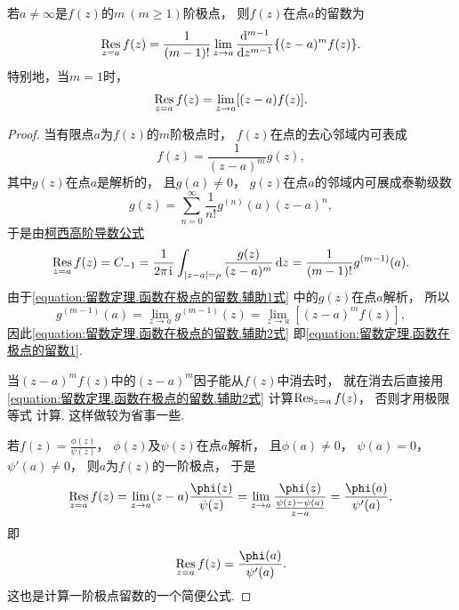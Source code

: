 \begin{property}
若\(a\neq\infty\)是\(f(z)\)的\(m\ (m\geq1)\)阶极点，
则\(f(z)\)在点\(a\)的留数为
\begin{equation}\label{equation:留数定理.函数在极点的留数1}
	\operatorname*{Res}_{z=a} f(z)
	= \frac{1}{(m-1)!} \lim_{z \to a} \dv[m-1]{z} \{ (z-a)^m f(z) \}.
\end{equation}
特别地，当\(m=1\)时，
\begin{equation}\label{equation:留数定理.函数在极点的留数2}
	\operatorname*{Res}_{z=a} f(z)
	= \lim_{z \to a} [(z-a) f(z)].
\end{equation}
\begin{proof}
当有限点\(a\)为\(f(z)\)的\(m\)阶极点时，
\(f(z)\)在点的去心邻域内可表成
\begin{equation}\label{equation:留数定理.函数在极点的留数.辅助1式}
	f(z) = \frac{1}{(z-a)^m} g(z),
\end{equation}
其中\(g(z)\)在点\(a\)是解析的，
且\(g(a)\neq0\)，
\(g(z)\)在点\(a\)的邻域内可展成泰勒级数\begin{equation*}
	g(z) = \sum_{n=0}^\infty \frac{1}{n!} g^{(n)}(a) (z-a)^n,
\end{equation*}
于是由\hyperref[equation:解析函数的积分表示.柯西高阶导数公式]{柯西高阶导数公式}
\begin{equation}\label{equation:留数定理.函数在极点的留数.辅助2式}
	\operatorname*{Res}_{z=a} f(z) = C_{-1}
	= \frac{1}{2\pi\kern1pt\mathrm{i}\kern1pt} \int_{\abs{z-a}=\rho} \frac{g(z)}{(z-a)^m} \dd{z}
	= \frac{1}{(m-1)!} g^{(m-1)}(a).
\end{equation}
由于\cref{equation:留数定理.函数在极点的留数.辅助1式} 中的\(g(z)\)在点\(a\)解析，
所以\begin{equation*}
	g^{(m-1)}(a) = \lim_{z \to a} g^{(m-1)}(z)
	= \lim_{z \to a} [(z-a)^m f(z)],
\end{equation*}
因此\cref{equation:留数定理.函数在极点的留数.辅助2式}
即\cref{equation:留数定理.函数在极点的留数1}.

当\((z-a)^m f(z)\)中的\((z-a)^m\)因子能从\(f(z)\)中消去时，
就在消去后直接用\cref{equation:留数定理.函数在极点的留数.辅助2式}
计算\(\operatorname*{Res}_{z=a} f(z)\)，
否则才用极限等式  计算.
这样做较为省事一些.

若\(f(z) = \frac{\phi(z)}{\psi(z)}\)，
\(\phi(z)\)及\(\psi(z)\)在点\(a\)解析，
且\(\phi(a)\neq0\)，
\(\psi(a)=0\)，
\(\psi'(a)\neq0\)，
则\(a\)为\(f(z)\)的一阶极点，
于是\begin{equation*}
	\Res_{z=a} f(z)
	= \lim_{z \to a} (z-a) \frac{\phi(z)}{\psi(z)}
	= \lim_{z \to a} \frac{\phi(z)}{\frac{\psi(z)-\psi(a)}{z-a}}
	= \frac{\phi(a)}{\psi'(a)},
\end{equation*}
即\begin{equation}\label{equation:留数定理.函数在极点的留数3}
	\Res_{z=a} f(z)
	= \frac{\phi(a)}{\psi'(a)}.
\end{equation}
这也是计算一阶极点留数的一个简便公式.
\end{proof}
\end{property}

